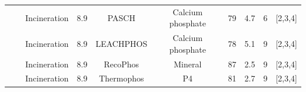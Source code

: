 \documentclass[authoryear]{elsarticle}
\begin{document}
\begin{table}[h]
{\begin{threeparttable}
\begin{tabular}{@{}cccccccccc@{}}
			&                                                                                                                                                         & Incineration                                                                     & 8.9                                    & PASCH                                                                                    & Calcium phosphate                                                                 & 79                                                                                    & 4.7                                  & 6                                                            &  [2,3,4]  \\
			&                                                                                                                                                         & Incineration                                                                     & 8.9                                    & LEACHPHOS                                                                                & Calcium phosphate                                                                 & 78                                                                                    & 5.1                                  & 9                                                            &  [2,3,4]  \\
			&                                                                                                                                                         & Incineration                                                                     & 8.9                                    & RecoPhos                                                                                 & Mineral                                                                           & 87                                                                                    & 2.5                                  & 9                                                            & [2,3,4]   \\
			&                                                                                                                                                         & Incineration                                                                     & 8.9                                    & Thermophos                                                                               & P4                                                                                & 81                                                                                    & 2.7                                  & 9                                                            &  [2,3,4]  \\ \cmidrule(l){2-10}

\end{tabular}
\end{threeparttable}}
\end{table}
\end{document}
